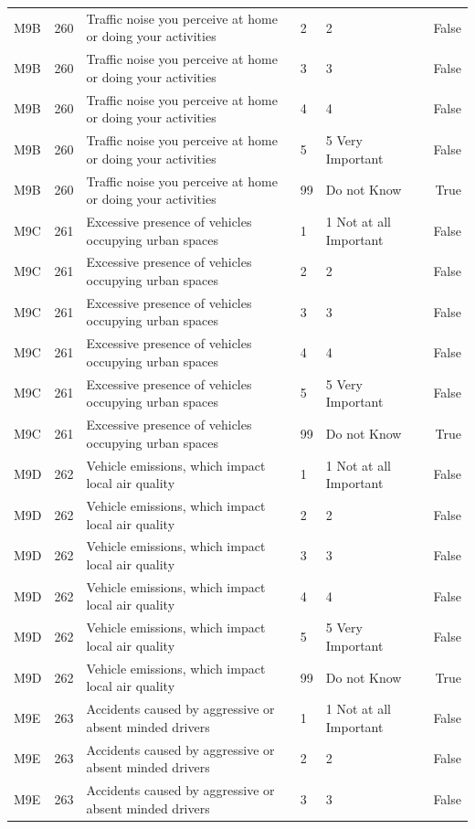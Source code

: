 \begin{tabular}{lrlllr}
M9B & 260 & Traffic noise you perceive at home or doing your activities & 2 & 2 & False \\
M9B & 260 & Traffic noise you perceive at home or doing your activities & 3 & 3 & False \\
M9B & 260 & Traffic noise you perceive at home or doing your activities & 4 & 4 & False \\
M9B & 260 & Traffic noise you perceive at home or doing your activities & 5 & 5 Very Important & False \\
M9B & 260 & Traffic noise you perceive at home or doing your activities & 99 & Do not Know & True \\
M9C & 261 & Excessive presence of vehicles occupying urban spaces & 1 & 1 Not at all Important & False \\
M9C & 261 & Excessive presence of vehicles occupying urban spaces & 2 & 2 & False \\
M9C & 261 & Excessive presence of vehicles occupying urban spaces & 3 & 3 & False \\
M9C & 261 & Excessive presence of vehicles occupying urban spaces & 4 & 4 & False \\
M9C & 261 & Excessive presence of vehicles occupying urban spaces & 5 & 5 Very Important & False \\
M9C & 261 & Excessive presence of vehicles occupying urban spaces & 99 & Do not Know & True \\
M9D & 262 & Vehicle emissions, which impact local air quality & 1 & 1 Not at all Important & False \\
M9D & 262 & Vehicle emissions, which impact local air quality & 2 & 2 & False \\
M9D & 262 & Vehicle emissions, which impact local air quality & 3 & 3 & False \\
M9D & 262 & Vehicle emissions, which impact local air quality & 4 & 4 & False \\
M9D & 262 & Vehicle emissions, which impact local air quality & 5 & 5 Very Important & False \\
M9D & 262 & Vehicle emissions, which impact local air quality & 99 & Do not Know & True \\
M9E & 263 & Accidents caused by aggressive or absent minded drivers & 1 & 1 Not at all Important & False \\
M9E & 263 & Accidents caused by aggressive or absent minded drivers & 2 & 2 & False \\
M9E & 263 & Accidents caused by aggressive or absent minded drivers & 3 & 3 & False \\

\end{tabular}
